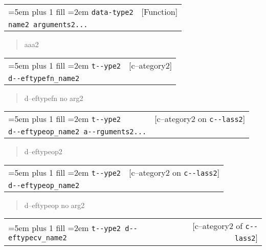 \documentclass{book}
\begin{document}
\noindent\begin{tabularx}{\linewidth}{@{}Xr}
\rightskip=5em plus 1 fill
\hangindent=2em
\texttt{data-type2}& [Function]\\
\texttt{name2 arguments2...}\end{tabularx}

%
\begin{quote}
\unskip{\parskip=0pt\noindent}%
aaa2
\end{quote}


\noindent\begin{tabularx}{\linewidth}{@{}Xr}
\rightskip=5em plus 1 fill
\hangindent=2em
\texttt{t{-}{-}ype2}& [c--ategory2]\\
\texttt{d{-}{-}eftypefn\_name2}\end{tabularx}

%
\begin{quote}
\unskip{\parskip=0pt\noindent}%
d--eftypefn no arg2
\end{quote}


\noindent\begin{tabularx}{\linewidth}{@{}Xr}
\rightskip=5em plus 1 fill
\hangindent=2em
\texttt{t{-}{-}ype2}& [c--ategory2 on \texttt{c{-}{-}lass2}]\\
\texttt{d{-}{-}eftypeop\_name2 a{-}{-}rguments2...}\end{tabularx}

%
\begin{quote}
\unskip{\parskip=0pt\noindent}%
d--eftypeop2
\end{quote}


\noindent\begin{tabularx}{\linewidth}{@{}Xr}
\rightskip=5em plus 1 fill
\hangindent=2em
\texttt{t{-}{-}ype2}& [c--ategory2 on \texttt{c{-}{-}lass2}]\\
\texttt{d{-}{-}eftypeop\_name2}\end{tabularx}

%
\begin{quote}
\unskip{\parskip=0pt\noindent}%
d--eftypeop no arg2
\end{quote}


\noindent\begin{tabularx}{\linewidth}{@{}Xr}
\rightskip=5em plus 1 fill
\hangindent=2em
\texttt{t{-}{-}ype2 d{-}{-}eftypecv\_name2}& [c--ategory2 of \texttt{c{-}{-}lass2}]
\end{tabularx}
\end{document}
